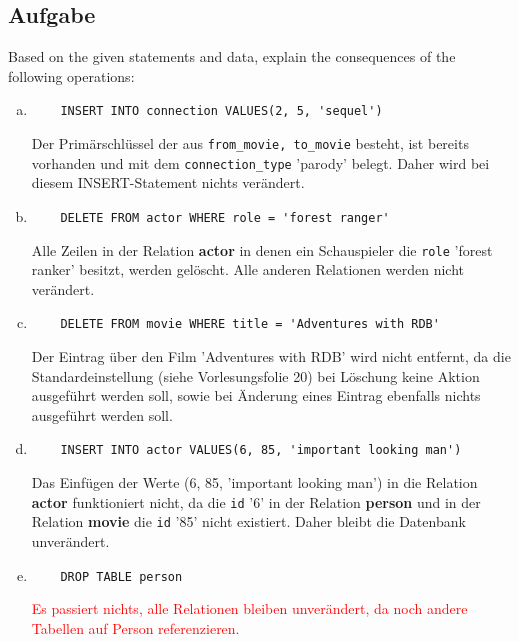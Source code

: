 \documentclass[11pt,a4paper,DIV=9]{scrartcl}
\newcounter{temp}
\newcommand{\aufgabe}[1]{
  \setcounter{temp}{\value{subsection}}
  \setcounter{subsection}{#1}
  \addtocounter{subsection}{-1}
  \subsection{Aufgabe}
  \setcounter{subsection}{\value{temp}}
}
\begin{document}
\aufgabe{2}
   Based on the given statements and data, explain the consequences of the following operations:
   \begin{enumerate}[a)]
   \item \begin{lstlisting} 
	INSERT INTO connection VALUES(2, 5, 'sequel') 
   \end{lstlisting} 
   Der Prim\"arschl\"ussel der aus \texttt{from\_movie, to\_movie} besteht, ist bereits vorhanden und mit dem \texttt{connection\_type} 'parody' belegt. Daher wird bei diesem INSERT-Statement nichts ver\"andert.
   
   
   \item \begin{lstlisting} 
	DELETE FROM actor WHERE role = 'forest ranger'
      \end{lstlisting}
      Alle Zeilen in der Relation \textbf{actor} in denen ein Schauspieler die \texttt{role} 'forest ranker' besitzt, werden gel\"oscht. Alle anderen Relationen werden nicht ver\"andert.
   
   

   \item \begin{lstlisting} 
	DELETE FROM movie WHERE title = 'Adventures with RDB'
   \end{lstlisting}
   Der Eintrag \"uber den Film 'Adventures with RDB' wird nicht entfernt, da die Standardeinstellung (siehe Vorlesungsfolie 20) bei L\"oschung keine Aktion ausgef\"uhrt werden soll, sowie bei \"Anderung eines Eintrag ebenfalls nichts ausgef\"uhrt werden soll.
   
   

   \item \begin{lstlisting} 
	INSERT INTO actor VALUES(6, 85, 'important looking man')
   \end{lstlisting}
   Das Einf\"ugen der Werte (6, 85, 'important looking man') in die Relation \textbf{actor} funktioniert nicht, da die \texttt{id} '6' in der Relation \textbf{person} und in der Relation \textbf{movie} die \texttt{id} '85' nicht existiert. Daher bleibt die Datenbank unver\"andert.
   
   

   \item \begin{lstlisting} 
	DROP TABLE person
  \end{lstlisting}
  \textcolor{red}{Es passiert nichts, alle Relationen bleiben unver\"andert, da noch andere Tabellen auf Person referenzieren.}
 

 \end{enumerate}   
\end{document}
